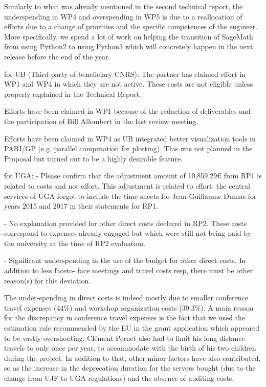 Similarly to what was already mentioned in the second technical report, the
underspending in WP4 and overspending in WP5 is due to a reallocation of
efforts due to a change of priorities and the specific competences of the
engineer. More specifically, we spend a lot of work on helping the transition
of SageMath from using Python2 to using Python3 which will concretely happen
in the next release before the end of the year.

for UB (Third party of beneficiary CNRS):
The partner has claimed effort in WP1 and WP4 in which they are not active. These costs are
not eligible unless properly explained in the Technical Report.

Efforts have been claimed in WP1 because of the redaction of deliverables and
the participation of Bill Allombert in the last review meeting.

Efforts have been claimed in WP4 as UB integrated better visualization tools in
PARI/GP (e.g. parallel computation for plotting). This was not planned in the
Proposal but turned out to be a highly desirable feature.

for UGA: 
- Please confirm that the adjustment amount of 10,859.29€ from RP1 is related to costs and not
effort.
 This adjustment is related to effort: the central services of UGA forgot to include the time
 sheets for Jean-Guillaume Dumas for years 2015 and 2017 in their statements for RP1.

- No explanation provided for other direct costs declared in RP2.
These costs correspond to expenses already engaged but which were still not being paid by the university at
the time of RP2 evaluation.

- Significant underspending in the use of the budget for other direct costs. In addition to less faceto-
face meetings and travel costs resp, there must be other reason(s) for this deviation.

The under-spending in direct costs is indeed mostly due to smaller conference travel expenses (44\%) and workshop
organization costs (39.3\%). A main reason for the discrepancy in conference travel expenses is the
fact that we used the estimation rule recommended by the EU in the grant application which appeared
to be vastly overshooting. Cl\'ement Pernet also had to limit his long distance travels to only once
per year, to accommodate with the birth of his two children during the project.
In addition to that,
other minor factors have also contributed, so as the increase in the deprecation duration for the
servers bought (due to the change from UJF to UGA regulations) and the absence of auditing costs.

